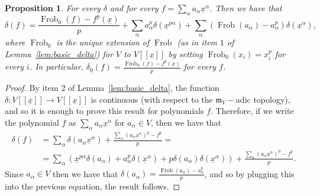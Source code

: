 \documentclass{article}
\newtheorem{proposition}[theorem]{Proposition}
\DeclareMathOperator{\Frob}{Frob}
\newcommand{\maxV}{\mathfrak{m}_V}
\newcommand{\Vx}{V[[\underline{x}]]}
\numberwithin{theorem}{section}
\begin{document}
\begin{proposition}\label{prop:delta_general_form}
    For every $\delta$ and for every $f=\sum_{\alpha} a_{\alpha} \underline{x}^{\alpha}$. Then we have that 
    \begin{equation*}
        \delta(f)= \frac{\Frob_0(f) - f^p(\underline{x})}{p} + \sum_{\alpha} a_{\alpha}^p \delta(\underline{x}^{p\alpha}) + \sum_{\alpha} (\Frob(a_{\alpha}) - a_{\alpha}^p) \delta(\underline{x}^{\alpha}),
    \end{equation*}
   \noindent where $\Frob_0$ is the unique extension of $\Frob$ (as in item $1$ of Lemma~\ref{lem:basic_delta}) for $V$ to $\Vx$ by setting $\Frob_0(x_i)=x_i^p$ for every $i$.  In particular, $\delta_{\underline{0}}(f)=\frac{\Frob_0(f) - f^p(\underline{x})}{p}$ for every $f$. 
\end{proposition}

\begin{proof}
    By item 2 of Lemma~\ref{lem:basic_delta}, the function $\delta \colon \Vx \to \Vx$ is continuous (with respect to the $\maxV-$adic topology), and so it is enough to prove this result for polynomials $f$. Therefore, if we write the polynomial $f$ as $\sum_\alpha a_{\alpha}\underline{x}^\alpha$ for $a_\alpha \in V$, then we have that 
    \begin{equation*}
        \begin{split}
            \delta(f)&=\sum_{\alpha} \delta(a_{\alpha} \underline{x}^{\alpha}) + \frac{\sum_{\alpha} (a_{\alpha} \underline{x}^{\alpha})^p-f^p}{p}=\\
            &=\sum_{\alpha} (\underline{x}^{p\alpha}\delta(a_{\alpha}) + a_{\alpha}^p \delta(\underline{x}^{\alpha}) + p \delta(a_{\alpha})\delta(\underline{x}^{\alpha}) ) + \frac{\sum_{\alpha} (a_{\alpha} \underline{x}^{\alpha})^p-f^p}{p}.
        \end{split}
    \end{equation*}
    \noindent Since $a_{\alpha} \in V$ then we have that $\delta(a_{\alpha})=\frac{\Frob(a_{\alpha})-a_{\alpha}^p}{p}$, and so by plugging this into the previous equation, the result follows. 
\end{proof}
\end{document}
